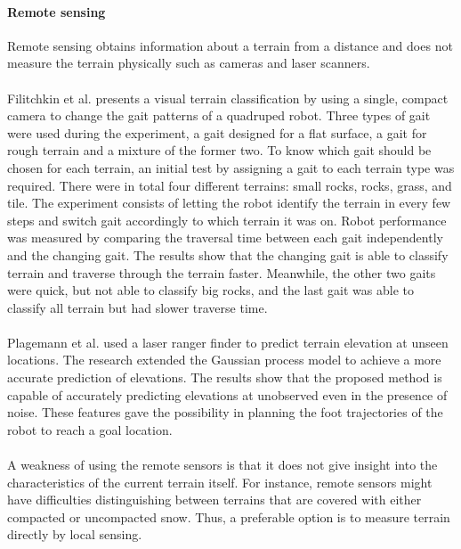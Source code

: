 \documentclass[USenglish]{ifimaster}  %
\begin{document}
\paragraph{Remote sensing}
Remote sensing obtains information about a terrain from a distance and does not measure the terrain physically such as cameras and laser scanners. 
\\
\\ 
Filitchkin et al. \cite{littleDog} presents a visual terrain classification by using a single, compact camera to change the gait patterns of a quadruped robot. Three types of gait were used during the experiment, a gait designed for a flat surface, a gait for rough terrain and a mixture of the former two. To know which gait should be chosen for each terrain, an initial test by assigning a gait to each terrain type was required. There were in total four different terrains: small rocks, rocks, grass, and tile. The experiment consists of letting the robot identify the terrain in every few steps and switch gait accordingly to which terrain it was on. Robot performance was measured by comparing the traversal time between each gait independently and the changing gait. The results show that the changing gait is able to classify terrain and traverse through the terrain faster. Meanwhile, the other two gaits were quick, but not able to classify big rocks, and the last gait was able to classify all terrain but had slower traverse time.
\\
\\
Plagemann et al. \cite{4651026} used a laser ranger finder to predict terrain elevation at unseen locations. The research extended the Gaussian process model to achieve a more accurate prediction of elevations. The results show that the proposed method is capable of accurately predicting elevations at unobserved even in the presence of noise. These features gave the possibility in planning the foot trajectories of the robot to reach a goal location.
\\
\\
A weakness of using the remote sensors is that it does not give insight into the characteristics of the current terrain itself. For instance, remote sensors might have difficulties distinguishing between terrains that are covered with either compacted or uncompacted snow. Thus, a preferable option is to measure terrain directly by local sensing.

	
\end{document}

